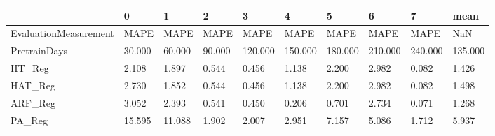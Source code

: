 \begin{tabular}{llllllllll}
\toprule
{} &      0 &      1 &      2 &       3 &       4 &       5 &       6 &       7 &    mean \\
\midrule
EvaluationMeasurement &   MAPE &   MAPE &   MAPE &    MAPE &    MAPE &    MAPE &    MAPE &    MAPE &     NaN \\
PretrainDays          & 30.000 & 60.000 & 90.000 & 120.000 & 150.000 & 180.000 & 210.000 & 240.000 & 135.000 \\
HT\_Reg                &  2.108 &  1.897 &  0.544 &   0.456 &   1.138 &   2.200 &   2.982 &   0.082 &   1.426 \\
HAT\_Reg               &  2.730 &  1.852 &  0.544 &   0.456 &   1.138 &   2.200 &   2.982 &   0.082 &   1.498 \\
ARF\_Reg               &  3.052 &  2.393 &  0.541 &   0.450 &   0.206 &   0.701 &   2.734 &   0.071 &   1.268 \\
PA\_Reg                & 15.595 & 11.088 &  1.902 &   2.007 &   2.951 &   7.157 &   5.086 &   1.712 &   5.937 \\
\bottomrule
\end{tabular}
